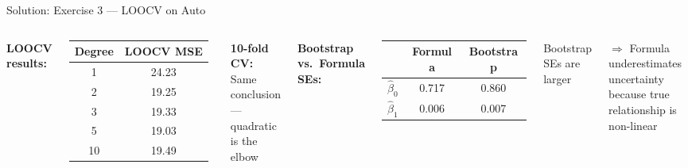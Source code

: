 \documentclass[aspectratio=169, 11pt]{beamer}
\begin{document}
\begin{frame}{Solution: Exercise 3 --- LOOCV on Auto}
\begin{columns}
\textbf{LOOCV results:}

\begin{tabular}{cc}
\toprule
Degree & LOOCV MSE \\
\midrule
1 & 24.23 \\
\textcolor{softgreen}{2} & \textcolor{softgreen}{19.25} \\
3 & 19.33 \\
5 & 19.03 \\
10 & 19.49 \\
\bottomrule
\end{tabular}

\vspace{0.3em}
\textbf{10-fold CV:} Same conclusion\\
--- quadratic is the elbow

\textbf{Bootstrap vs.\ Formula SEs:}

\vspace{0.3em}
\begin{tabular}{lcc}
\toprule
 & Formula & Bootstrap \\
\midrule
$\hat{\beta}_0$ & 0.717 & 0.860 \\
$\hat{\beta}_1$ & 0.006 & 0.007 \\
\bottomrule
\end{tabular}

\vspace{0.3em}
Bootstrap SEs are larger

$\Rightarrow$ Formula underestimates uncertainty because true relationship is non-linear
\end{columns}
\end{frame}
\end{document}
